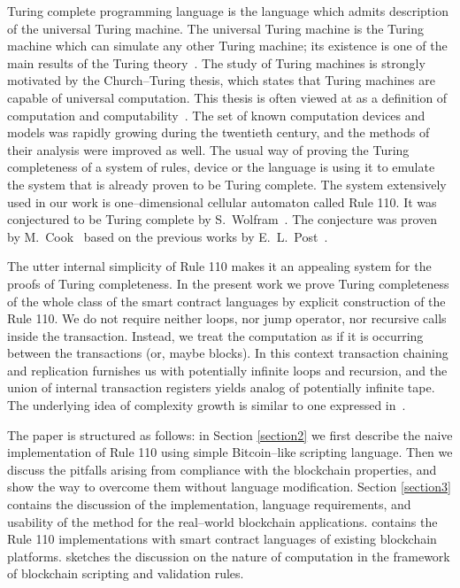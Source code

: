 \documentclass[runningheads]{llncs}
\begin{document}
    Turing complete programming language is the language which admits description
    of the universal Turing machine. The universal Turing machine is the Turing
    machine which can simulate any other Turing machine; its existence is one of
    the main results of the Turing theory~\cite{turing1937computable}. The study
    of Turing machines is strongly motivated by the Church--Turing thesis, which
    states that Turing machines are capable of universal computation. This
    thesis is often viewed at as a definition of computation and
    computability~\cite{turing1939systems}. The set of known
    computation devices and models was rapidly growing during the twentieth
    century, and the methods of their analysis were improved as well. The
    usual way of proving the Turing completeness of a system of rules, device or
    the language is using it to emulate the system that is already proven to be
    Turing complete.
    The system extensively used in our work is one--dimensional
    cellular automaton called Rule 110. It was conjectured to be Turing complete
    by S.~Wolfram~\cite{wolfram1986theory}. The conjecture was proven by
    M.~Cook~\cite{cook2004universality} based on the previous works by
    E.~L.~Post~\cite{post1943formal}.

    The utter internal simplicity of Rule 110 makes it an appealing system for
    the proofs of Turing completeness. In the present work we prove Turing
    completeness of the whole class of the smart contract languages by explicit
    construction of the Rule 110. We do not require neither loops, nor jump
    operator, nor recursive calls inside the transaction. Instead, we treat the
    computation as if it is occurring between the transactions (or, maybe
    blocks). In this context transaction chaining and replication furnishes us
    with potentially infinite loops and recursion, and the union of internal
    transaction registers yields analog of potentially infinite tape. The
    underlying idea of complexity growth is similar to one expressed
    in~\cite{von1951general}.

    The paper is structured as follows: in Section \ref{section2} we first describe the naive
    implementation of Rule 110 using simple Bitcoin--like scripting language.
    Then we discuss the pitfalls arising from compliance with the blockchain
    properties, and show the way to overcome them without language modification.
    Section \ref{section3} contains the discussion of the implementation, language
    requirements, and usability of the method for the real--world blockchain
    applications.  contains the Rule 110 implementations with smart
    contract languages of existing blockchain platforms.  sketches
    the discussion on the nature of computation in the framework of blockchain
    scripting and validation rules.
\end{document}
